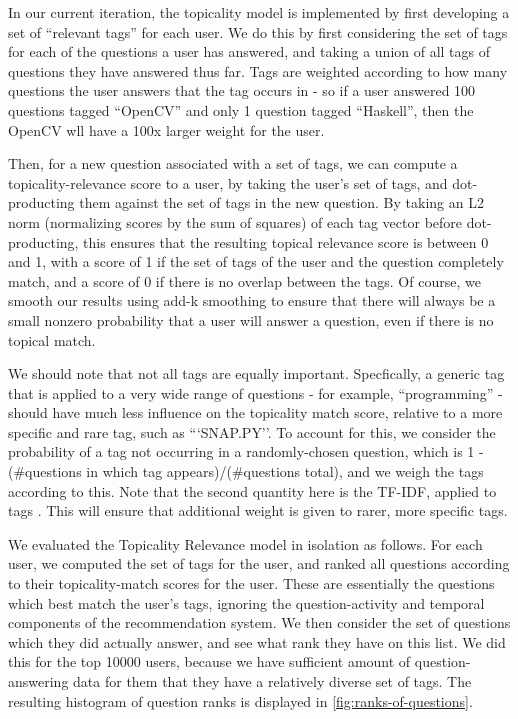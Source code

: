 \documentclass[a4paper]{article}
\begin{document}
In our current iteration, the topicality model is implemented by first developing a set of ``relevant tags'' for each user. We do this by first considering the set of tags for each of the questions a user has answered, and taking a union of all tags of questions they have answered thus far. Tags are weighted according to how many questions the user answers that the tag occurs in - so if a user answered 100 questions tagged ``OpenCV'' and only 1 question tagged ``Haskell'', then the OpenCV wll have a 100x larger weight for the user.

Then, for a new question associated with a set of tags, we can compute a topicality-relevance score to a user, by taking the user's set of tags, and dot-producting them against the set of tags in the new question. By taking an L2 norm (normalizing scores by the sum of squares) of each tag vector before dot-producting, this ensures that the resulting topical relevance score is between 0 and 1, with a score of 1 if the set of tags of the user and the question completely match, and a score of 0 if there is no overlap between the tags. Of course, we smooth our results using add-k smoothing to ensure that there will always be a small nonzero probability that a user will answer a question, even if there is no topical match.

We should note that not all tags are equally important. Specfically, a generic tag that is applied to a very wide range of questions - for example, ``programming'' - should have much less influence on the topicality match score, relative to a more specific and rare tag, such as ```SNAP.PY''. To account for this, we consider the probability of a tag not occurring in a randomly-chosen question, which is 1 - (\#questions in which tag appears)/(\#questions total), and we weigh the tags according to this. Note that the second quantity here is the TF-IDF, applied to tags \cite{pazzani2007}. This will ensure that additional weight is given to rarer, more specific tags.


We evaluated the Topicality Relevance model in isolation as follows. For each user, we computed the set of tags for the user, and ranked all questions according to their topicality-match scores for the user. These are essentially the questions which best match the user's tags, ignoring the question-activity and temporal components of the recommendation system. We then consider the set of questions which they did actually answer, and see what rank they have on this list. We did this for the top 10000 users, because we have sufficient amount of question-answering data for them that they have a relatively diverse set of tags. The resulting histogram of question ranks is displayed in \ref{fig:ranks-of-questions}.
\end{document}
